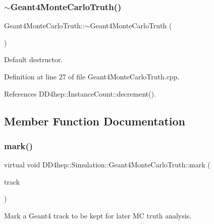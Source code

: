 \subsubsection{\texorpdfstring{$\sim$\+Geant4\+Monte\+Carlo\+Truth()}{~Geant4MonteCarloTruth()}}
{\footnotesize\ttfamily Geant4\+Monte\+Carlo\+Truth\+::$\sim$\+Geant4\+Monte\+Carlo\+Truth (\begin{DoxyParamCaption}{ }\end{DoxyParamCaption})\hspace{0.3cm}{\ttfamily [virtual]}}



Default destructor. 



Definition at line 27 of file Geant4\+Monte\+Carlo\+Truth.\+cpp.



References D\+D4hep\+::\+Instance\+Count\+::decrement().



\subsection{Member Function Documentation}
\hypertarget{class_d_d4hep_1_1_simulation_1_1_geant4_monte_carlo_truth_ad74253c38fb6e00003b591a07e5e748d}{}\label{class_d_d4hep_1_1_simulation_1_1_geant4_monte_carlo_truth_ad74253c38fb6e00003b591a07e5e748d} 
\subsubsection{\texorpdfstring{mark()}{mark()}\hspace{0.1cm}{\footnotesize\ttfamily [1/4]}}
{\footnotesize\ttfamily virtual void D\+D4hep\+::\+Simulation\+::\+Geant4\+Monte\+Carlo\+Truth\+::mark (\begin{DoxyParamCaption}\item[{const G4\+Track $\ast$}]{track }\end{DoxyParamCaption})\hspace{0.3cm}{\ttfamily [pure virtual]}}



Mark a Geant4 track to be kept for later MC truth analysis. 



